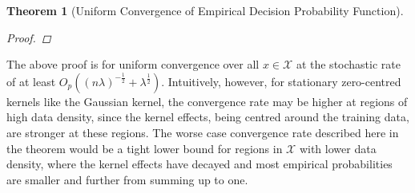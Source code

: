 \documentclass{article}
\newtheorem{theorem}{Theorem}[section]
\begin{document}
\begin{theorem}[Uniform Convergence of Empirical Decision Probability Function]
\begin{proof}
%			
%			
			
		\end{proof}
	\end{theorem}
	
	The above proof is for uniform convergence over all $x \in \mathcal{X}$ at the stochastic rate of at least $O_{p}((n \lambda)^{-\frac{1}{2}} + \lambda^{\frac{1}{2}})$. Intuitively, however, for stationary zero-centred kernels like the Gaussian kernel, the convergence rate may be higher at regions of high data density, since the kernel effects, being centred around the training data, are stronger at these regions. The worse case convergence rate described here in the theorem would be a tight lower bound for regions in $\mathcal{X}$ with lower data density, where the kernel effects have decayed and most empirical probabilities are smaller and further from summing up to one.
	
\end{document}
